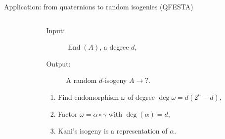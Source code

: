 \documentclass[aspectratio=169]{beamer}
\newcommand{\End}{\operatorname{End}}
\begin{document}
\begin{frame}{Application: from quaternions to random isogenies (QFESTA)}
  \large
  \begin{columns}
    \begin{column}{0.4\textwidth}
      \centering
    \end{column}
    \begin{column}{0.6\textwidth}
      \begin{description}
      \item[Input:] $\End(A)$, a degree $d$,
      \item[Output:] A random $d$-isogeny $A→?$.
      \end{description}
      \begin{enumerate}
      \item Find endomorphism $ω$ of degree
        \emph{$\deg ω = d(2^n - d)$},
      \item Factor \emph{$ω = α∘γ$} with \emph{$\deg(α) = d$},
      \item Kani's isogeny is a representation of $α$.
      \end{enumerate}
    \end{column}  
  \end{columns}
\end{frame}

\end{document}
